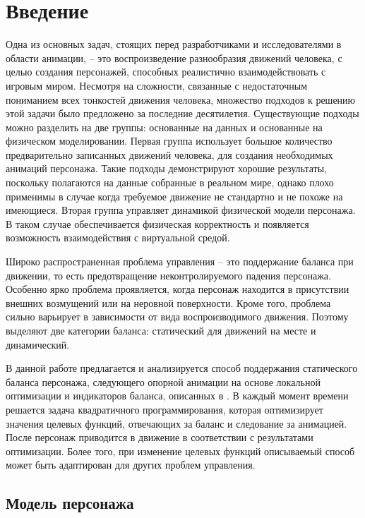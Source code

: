 \section{Введение}

Одна из основных задач, стоящих перед разработчиками и исследователями в области анимации, -- это воспроизведение разнообразия движений человека, с целью  создания персонажей, способных реалистично взаимодействовать с игровым миром. Несмотря на сложности, связанные с недостаточным пониманием всех тонкостей движения человека, множество подходов к решению этой задачи было предложено за последние десятилетия. Существующие подходы можно разделить на две группы: основанные на данных и основанные на физическом моделировании. Первая группа использует большое количество предварительно записанных движений человека, для создания необходимых анимаций персонажа. Такие подходы демонстрируют хорошие результаты, поскольку полагаются на данные собранные в реальном мире, однако плохо применимы в случае когда требуемое движение не стандартно и не похоже на имеющиеся. Вторая группа управляет динамикой физической модели персонажа. В таком случае обеспечивается физическая корректность и появляется возможность взаимодействия с виртуальной средой.

Широко распространенная проблема управления -- это поддержание баланса при движении, то есть предотвращение неконтролируемого падения персонажа. Особенно ярко проблема проявляется, когда персонаж находится в присутствии внешних возмущений или на неровной поверхности. Кроме того, проблема сильно варьирует в зависимости от вида воспроизводимого движения. Поэтому выделяют две категории баланса: статический для движений на месте и динамический.

В данной работе предлагается и анализируется способ поддержания статического баланса персонажа, следующего опорной анимации на основе локальной оптимизации и индикаторов баланса, описанных в \cite{MacchiettoZS}. В каждый момент времени решается задача квадратичного программирования, которая оптимизирует значения целевых функций, отвечающих за баланс и следование за анимацией. После персонаж приводится в движение в соответствии с результатами оптимизации. Более того, при изменение целевых функций описываемый способ может быть адаптирован для других проблем управления.

\subsection{Модель персонажа}

